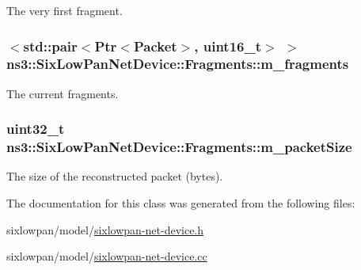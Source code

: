 The very first fragment. 

\subsubsection[{\texorpdfstring{m\+\_\+fragments}{m_fragments}}]{$<$std\+::pair$<${\bf Ptr}$<${\bf Packet}$>$, uint16\+\_\+t$>$ $>$ ns3\+::\+Six\+Low\+Pan\+Net\+Device\+::\+Fragments\+::m\+\_\+fragments\hspace{0.3cm}{\ttfamily [private]}}\hypertarget{classns3_1_1SixLowPanNetDevice_1_1Fragments_aac778380da2b0a760cdf0c31446bf0f9}{}\label{classns3_1_1SixLowPanNetDevice_1_1Fragments_aac778380da2b0a760cdf0c31446bf0f9}


The current fragments. 

\subsubsection[{\texorpdfstring{m\+\_\+packet\+Size}{m_packetSize}}]{\setlength{\rightskip}{0pt plus 5cm}uint32\+\_\+t ns3\+::\+Six\+Low\+Pan\+Net\+Device\+::\+Fragments\+::m\+\_\+packet\+Size\hspace{0.3cm}{\ttfamily [private]}}\hypertarget{classns3_1_1SixLowPanNetDevice_1_1Fragments_a8b00ddf1da93a1b9592c0899e31ea666}{}\label{classns3_1_1SixLowPanNetDevice_1_1Fragments_a8b00ddf1da93a1b9592c0899e31ea666}


The size of the reconstructed packet (bytes). 



The documentation for this class was generated from the following files\+:\begin{DoxyCompactItemize}
\item 
sixlowpan/model/\hyperlink{sixlowpan-net-device_8h}{sixlowpan-\/net-\/device.\+h}\item 
sixlowpan/model/\hyperlink{sixlowpan-net-device_8cc}{sixlowpan-\/net-\/device.\+cc}\end{DoxyCompactItemize}
